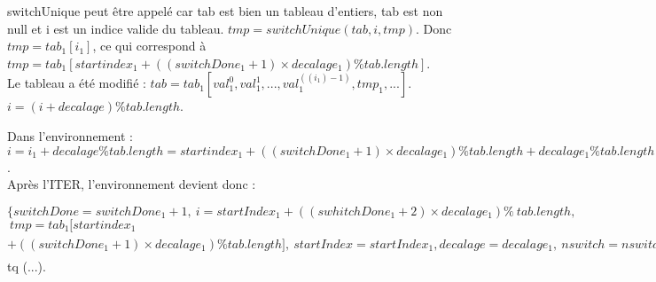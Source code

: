 switchUnique peut être appelé car tab est bien un tableau d'entiers, tab est non null et i est un indice valide du tableau. $tmp = switchUnique(tab, i, tmp)$. Donc $tmp = tab_{1}[i_1]$, ce qui correspond à $tmp = tab_{1}[startindex_{1} + ((switchDone_{1}+1)\times decalage_{1}) \% tab.length]$.\\

Le tableau a été modifié : $tab = tab_{1}[val_{1}^{0},val_{1}^{1}, ..., val_{1}^{((i_1)-1)}, tmp_{1}, ...]$.\\

 $i = (i+decalage) \% tab.length$.
 
 Dans l'environnement : $i = i_{1} + decalage \% tab.length = startindex_{1} + ((switchDone_{1}+1)\times decalage_{1}) \% tab.length  + decalage_{1} \%tab.length = startIndex_{1} + ((swhitchDone_{1}+2)\times decalage_{1}) \%tab.length. switchDone++$.\\
 
Après l'ITER, l'environnement devient donc : 

\noindent$\{switchDone = switchDone_{1}+1,\ i = startIndex_{1} + ((swhitchDone_{1}+2)\times decalage_1) \%\ tab.length,$\\
$\ tmp = tab_{1}[startindex_{1}$ $+ ((switchDone_{1}+1)\times decalage_{1}) \% tab.length],\ startIndex = startIndex_{1}, decalage = decalage_{1},\ nswitch = nswitch_{1},\ tab = tab_{1}[val_{1}^{0},val_{1}^{1}, ..., val_{1}^{((i_1)-1)}, tmp_{1}, ...]\}$\\
tq (...).\\

